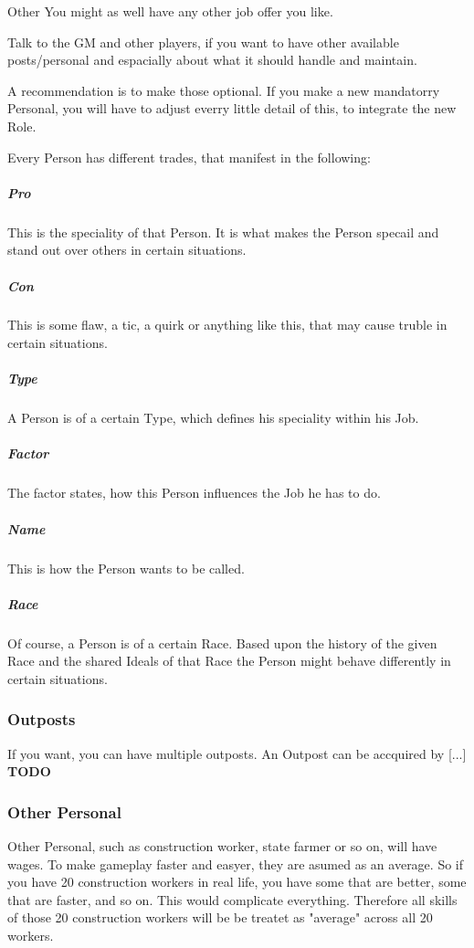 \documentclass[10pt,twoside,twocolumn,openany]{book}
\begin{document}
\begin{commentbox}{Other}
You might as well have any other job offer you like.

Talk to the GM and other players, if you want to have other available posts/personal and espacially about what it should handle and maintain.

A recommendation is to make those optional. If you make a new mandatorry Personal, you will have to adjust everry little detail of this, to integrate the new Role.
\end{commentbox}

Every Person has different trades, that manifest in the following:

\subparagraph{Pro} This is the speciality of that Person. It is what makes the Person specail and stand out over others in certain situations.

\subparagraph{Con} This is some flaw, a tic, a quirk or anything like this, that may cause truble in certain situations.

\subparagraph{Type} A Person is of a certain Type, which defines his speciality within his Job.

\subparagraph{Factor} The factor states, how this Person influences the Job he has to do.

\subparagraph{Name} This is how the Person wants to be called.

\subparagraph{Race} Of course, a Person is of a certain Race. Based upon the history of the given Race and the shared Ideals of that Race the Person might behave differently in certain situations.

\subsubsection{Outposts}

If you want, you can have multiple outposts. An Outpost can be accquired by [...] \textbf{TODO}

\subsubsection{Other Personal}

Other Personal, such as construction worker, state farmer or so on, will have wages. To make gameplay faster and easyer, they are asumed as an average. So if you have 20 construction workers in real life, you have some that are better, some that are faster, and so on. This would complicate everything. Therefore all skills of those 20 construction workers will be be treatet as "average" across all 20 workers.
\end{document}
